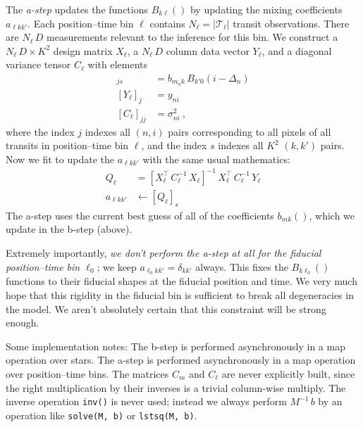\documentclass{article}
\newcommand{\set}[1]{\mathscr{#1}}
\begin{document}
The \emph{a-step} updates the functions $B_{k\ell}()$ by updating the mixing coefficients $a_{\ell kk'}$.
Each position--time bin $\ell$ contains $N_\ell=|\set{T}_\ell|$ transit observations.
There are $N_\ell\,D$ measurements relevant to the inference for this bin.
We construct a $N_\ell\,D\times K^2$ design matrix $X_\ell$, a $N_\ell\,D$ column data vector $Y_\ell$, and a diagonal variance tensor $C_\ell$ with elements 
\begin{align}
    [X_\ell]_{js} &= b_{m_nk}\,B_{k'0}(i-\Delta_n) \\
    [Y_\ell]_j &= y_{ni} \\
    [C_\ell]_{jj} &= \sigma^2_{ni} ~,
\end{align}
where the index $j$ indexes all $(n,i)$ pairs corresponding to all pixels of all transits in position--time bin $\ell$,
and the index $s$ indexes all $K^2$ $(k,k')$ pairs.
Now we fit to update the $a_{\ell kk'}$ with the same usual mathematics:
\begin{align}
    Q_\ell &= [X_\ell^\top\,C^{-1}_\ell\,X_\ell]^{-1}\,X_\ell^\top\,C^{-1}_\ell\,Y_\ell \\
    a_{\ell kk'} &\leftarrow [Q_\ell]_{s}
\end{align}
The a-step uses the current best guess of all of the coefficients $b_{mk}()$, which we update in the b-step (above).

Extremely importantly, \emph{we don't perform the a-step at all for the fiducial position--time bin $\ell_0$};
we keep $a_{\ell_0 kk'}=\delta_{kk'}$ always.
This fixes the $B_{k\ell_0}()$ functions to their fiducial shapes at the fiducial position and time.
We very much hope that this rigidity in the fiducial bin is sufficient to break all degeneracies in the model.
We aren't absolutely certain that this constraint will be strong enough.

Some implementation notes:
The b-step is performed asynchronously in a map operation over stars.
The a-step is performed asynchronously in a map operation over position--time bins.
The matrices $C_m$ and $C_\ell$ are never explicitly built, since the right multiplication by their inverses is a trivial column-wise multiply.
The inverse operation \texttt{inv()} is never used; instead we always perform $M^{-1}\,b$ by an operation like \texttt{solve(M, b)} or \texttt{lstsq(M, b)}.
\end{document}
